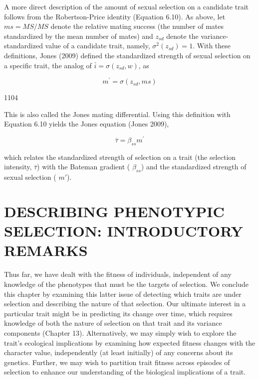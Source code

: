 \documentclass{article}
\begin{document}
A more direct description of the amount of sexual selection on a candidate trait follows from the Robertson-Price identity (Equation 6.10). As above, let  $ ms = MS/MS $ denote the relative mating success (the number of mates standardized by the mean number of mates) and  $ z_{sd} $ denote the variance-standardized value of a candidate trait, namely,  $ \sigma^{2}(z_{sd}) = 1 $. With these definitions, Jones (2009) defined the standardized strength of sexual selection on a specific trait, the analog of  $ \bar{i} = \sigma(z_{sd}, w) $, as

\begin{equation}
m^{\prime}=\sigma(z_{sd},ms)
\tag{29.14c}
\label{eq:29_14c}
\end{equation}

1104

This is also called the Jones mating differential. Using this definition with Equation 6.10 yields the Jones equation (Jones 2009),

\begin{equation}
\bar{\tau}=\beta_{ss}m^{\prime}
\tag{29.14d}
\label{eq:29_14d}
\end{equation}

which relates the standardized strength of selection on a trait (the selection intensity,  $ \bar{\tau} $) with the Bateman gradient ( $ \beta_{ss} $) and the standardized strength of sexual selection ( $ m' $).

\section{DESCRIBING PHENOTYPIC SELECTION: INTRODUCTORY REMARKS}
Thus far, we have dealt with the fitness of individuals, independent of any knowledge of the phenotypes that must be the targets of selection. We conclude this chapter by examining this latter issue of detecting which traits are under selection and describing the nature of that selection. Our ultimate interest in a particular trait might be in predicting its change over time, which requires knowledge of both the nature of selection on that trait and its variance components (Chapter 13). Alternatively, we may simply wish to explore the trait's ecological implications by examining how expected fitness changes with the character value, independently (at least initially) of any concerns about its genetics. Further, we may wish to partition trait fitness across episodes of selection to enhance our understanding of the biological implications of a trait.
\end{document}
